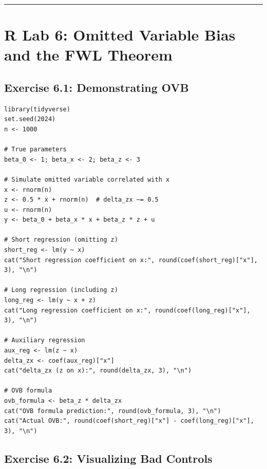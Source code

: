 \medskip\hrule\medskip

\section{R Lab 6: Omitted Variable Bias and the FWL Theorem}

\subsection{Exercise 6.1: Demonstrating OVB}

\begin{lstlisting}
library(tidyverse)
set.seed(2024)
n <- 1000

# True parameters
beta_0 <- 1; beta_x <- 2; beta_z <- 3

# Simulate omitted variable correlated with x
x <- rnorm(n)
z <- 0.5 * x + rnorm(n)  # delta_zx ~= 0.5
u <- rnorm(n)
y <- beta_0 + beta_x * x + beta_z * z + u

# Short regression (omitting z)
short_reg <- lm(y ~ x)
cat("Short regression coefficient on x:", round(coef(short_reg)["x"], 3), "\n")

# Long regression (including z)
long_reg <- lm(y ~ x + z)
cat("Long regression coefficient on x:", round(coef(long_reg)["x"], 3), "\n")

# Auxiliary regression
aux_reg <- lm(z ~ x)
delta_zx <- coef(aux_reg)["x"]
cat("delta_zx (z on x):", round(delta_zx, 3), "\n")

# OVB formula
ovb_formula <- beta_z * delta_zx
cat("OVB formula prediction:", round(ovb_formula, 3), "\n")
cat("Actual OVB:", round(coef(short_reg)["x"] - coef(long_reg)["x"], 3), "\n")
\end{lstlisting}

\subsection{Exercise 6.2: Visualizing Bad Controls}

